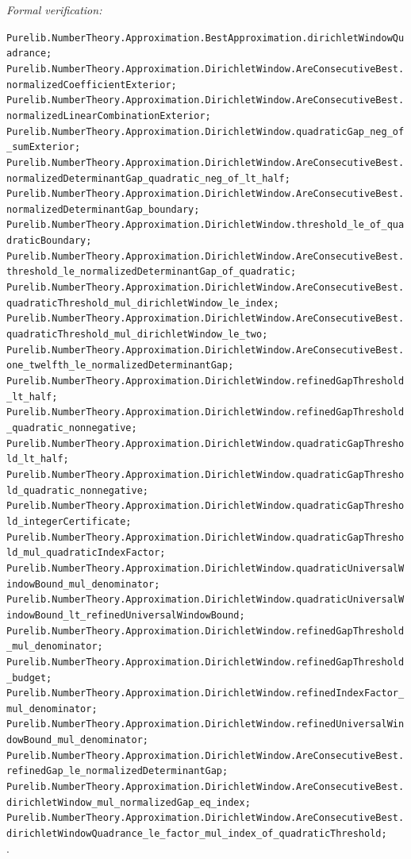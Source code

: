 \documentclass[11pt]{article}
\newcommand{\leanref}[1]{\par\smallskip\noindent
  \emph{Formal verification:}\par\nobreak
  {\raggedright\nolinkurl{#1}.\par}}
\begin{document}
\leanref{Purelib.NumberTheory.Approximation.BestApproximation.dirichletWindowQuadrance;
Purelib.NumberTheory.Approximation.DirichletWindow.AreConsecutiveBest.normalizedCoefficientExterior;
Purelib.NumberTheory.Approximation.DirichletWindow.AreConsecutiveBest.normalizedLinearCombinationExterior;
Purelib.NumberTheory.Approximation.DirichletWindow.quadraticGap_neg_of_sumExterior;
Purelib.NumberTheory.Approximation.DirichletWindow.AreConsecutiveBest.normalizedDeterminantGap_quadratic_neg_of_lt_half;
Purelib.NumberTheory.Approximation.DirichletWindow.AreConsecutiveBest.normalizedDeterminantGap_boundary;
Purelib.NumberTheory.Approximation.DirichletWindow.threshold_le_of_quadraticBoundary;
Purelib.NumberTheory.Approximation.DirichletWindow.AreConsecutiveBest.threshold_le_normalizedDeterminantGap_of_quadratic;
Purelib.NumberTheory.Approximation.DirichletWindow.AreConsecutiveBest.quadraticThreshold_mul_dirichletWindow_le_index;
Purelib.NumberTheory.Approximation.DirichletWindow.AreConsecutiveBest.quadraticThreshold_mul_dirichletWindow_le_two;
Purelib.NumberTheory.Approximation.DirichletWindow.AreConsecutiveBest.one_twelfth_le_normalizedDeterminantGap;
Purelib.NumberTheory.Approximation.DirichletWindow.refinedGapThreshold_lt_half;
Purelib.NumberTheory.Approximation.DirichletWindow.refinedGapThreshold_quadratic_nonnegative;
Purelib.NumberTheory.Approximation.DirichletWindow.quadraticGapThreshold_lt_half;
Purelib.NumberTheory.Approximation.DirichletWindow.quadraticGapThreshold_quadratic_nonnegative;
Purelib.NumberTheory.Approximation.DirichletWindow.quadraticGapThreshold_integerCertificate;
Purelib.NumberTheory.Approximation.DirichletWindow.quadraticGapThreshold_mul_quadraticIndexFactor;
Purelib.NumberTheory.Approximation.DirichletWindow.quadraticUniversalWindowBound_mul_denominator;
Purelib.NumberTheory.Approximation.DirichletWindow.quadraticUniversalWindowBound_lt_refinedUniversalWindowBound;
Purelib.NumberTheory.Approximation.DirichletWindow.refinedGapThreshold_mul_denominator;
Purelib.NumberTheory.Approximation.DirichletWindow.refinedGapThreshold_budget;
Purelib.NumberTheory.Approximation.DirichletWindow.refinedIndexFactor_mul_denominator;
Purelib.NumberTheory.Approximation.DirichletWindow.refinedUniversalWindowBound_mul_denominator;
Purelib.NumberTheory.Approximation.DirichletWindow.AreConsecutiveBest.refinedGap_le_normalizedDeterminantGap;
Purelib.NumberTheory.Approximation.DirichletWindow.AreConsecutiveBest.dirichletWindow_mul_normalizedGap_eq_index;
Purelib.NumberTheory.Approximation.DirichletWindow.AreConsecutiveBest.dirichletWindowQuadrance_le_factor_mul_index_of_quadraticThreshold;
}
\end{document}
